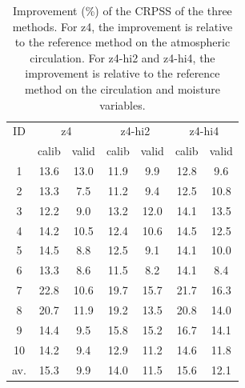 \documentclass[5p]{elsarticle}
\begin{document}
\begin{table}[htbp]
	\caption{Improvement (\%) of the CRPSS of the three methods. For z4, the improvement is relative to the reference method on the atmospheric circulation. For z4-hi2 and z4-hi4, the improvement is relative to the reference method on the circulation and moisture variables.}
	\footnotesize
	\begin{center}
		\begin{tabular}{ccccccc}
			\hline 
			ID & \multicolumn{2}{c}{z4} & \multicolumn{2}{c}{z4-hi2} & \multicolumn{2}{c}{z4-hi4} \\ 
			& calib & valid & calib & valid & calib & valid \\ 
			\hline 
			1 & 13.6 & 13.0 & 11.9 & 9.9 & 12.8 & 9.6 \\
			2 & 13.3 & 7.5 & 11.2 & 9.4 & 12.5 & 10.8 \\
			3 & 12.2 & 9.0 & 13.2 & 12.0 & 14.1 & 13.5 \\
			4 & 14.2 & 10.5 & 12.4 & 10.6 & 14.5 & 12.5 \\
			5 & 14.5 & 8.8 & 12.5 & 9.1 & 14.1 & 10.0 \\
			6 & 13.3 & 8.6 & 11.5 & 8.2 & 14.1 & 8.4 \\
			7 & 22.8 & 10.6 & 19.7 & 15.7 & 21.7 & 16.3 \\
			8 & 20.7 & 11.9 & 19.2 & 13.5 & 20.8 & 14.0 \\
			9 & 14.4 & 9.5 & 15.8 & 15.2 & 16.7 & 14.1 \\
			10 & 14.2 & 9.4 & 12.9 & 11.2 & 14.6 & 11.8 \\
			\hline
			av. & 15.3 & 9.9 & 14.0 & 11.5 & 15.6 & 12.1 \\ 
			\hline 
		\end{tabular} 
	\end{center}
	\label{table:scores_diff}
\end{table}
\end{document}
